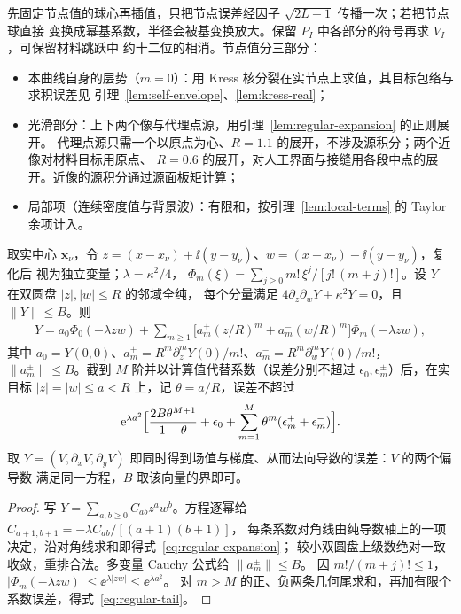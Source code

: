 先固定节点值的球心再插值，只把节点误差经因子 $\sqrt{2L-1}$ 传播一次；若把节点球直接
变换成幂基系数，半径会被基变换放大。保留 $P_I$ 中各部分的符号再求 $V_I$，可保留材料跳跃中
约十二位的相消。节点值分三部分：
\begin{itemize}
  \item 本曲线自身的层势（$m=0$）：用 Kress 核分裂在实节点上求值，其目标包络与求积误差见
    引理~\ref{lem:self-envelope}、\ref{lem:kress-real}；
  \item 光滑部分：上下两个像与代理点源，用引理~\ref{lem:regular-expansion} 的正则展开。
    代理点源只需一个以原点为心、$R=1.1$ 的展开，不涉及源积分；两个近像对材料目标用原点、
    $R=0.6$ 的展开，对人工界面与接缝用各段中点的展开。近像的源积分通过源面板矩计算；
  \item 局部项（连续密度值与背景波）：有限和，按引理~\ref{lem:local-terms} 的 Taylor 余项计入。
\end{itemize}

\begin{lemma}[正则 Helmholtz 展开]
  \label{lem:regular-expansion}
  取实中心 $\mathbf x_\nu$，令 $z=(x-x_\nu)+\ii(y-y_\nu)$、$w=(x-x_\nu)-\ii(y-y_\nu)$，复化后
  视为独立变量；$\lambda=\kappa^2/4$，
  $\Phi_m(\xi)=\sum_{j\geq0}m!\,\xi^j/[j!\,(m+j)!]$。设 $Y$ 在双圆盘 $|z|,|w|\leq R$ 的邻域全纯，
  每个分量满足 $4\partial_z\partial_wY+\kappa^2Y=0$，且 $\lVert Y\rVert\leq B$。则
  \begin{align}
    Y=a_0\Phi_0(-\lambda zw)+\sum_{m\geq1}\bigl[a_m^+(z/R)^m+a_m^-(w/R)^m\bigr]\Phi_m(-\lambda zw),
    \label{eq:regular-expansion}
  \end{align}
  其中 $a_0=Y(0,0)$、$a_m^+=R^m\partial_z^mY(0)/m!$、$a_m^-=R^m\partial_w^mY(0)/m!$，
  $\lVert a_m^\pm\rVert\leq B$。截到 $M$ 阶并以计算值代替系数（误差分别不超过
  $\epsilon_0,\epsilon_m^\pm$）后，在实目标 $|z|=|w|\leq a<R$ 上，记 $\theta=a/R$，误差不超过
  \begin{align}
    \mathrm{e}^{\lambda a^2}\Bigl[\frac{2B\theta^{M+1}}{1-\theta}+\epsilon_0
    +\sum_{m=1}^M\theta^m(\epsilon_m^++\epsilon_m^-)\Bigr].
    \label{eq:regular-tail}
  \end{align}
  取 $Y=(V,\partial_xV,\partial_yV)$ 即同时得到场值与梯度、从而法向导数的误差：$V$ 的两个偏导数
  满足同一方程，$B$ 取该向量的界即可。
\end{lemma}

\begin{proof}
  写 $Y=\sum_{a,b\ge0}C_{ab}z^aw^b$。方程逐幂给 $C_{a+1,b+1}=-\lambda C_{ab}/[(a+1)(b+1)]$，
  每条系数对角线由纯导数轴上的一项决定，沿对角线求和即得式~\eqref{eq:regular-expansion}；
  较小双圆盘上级数绝对一致收敛，重排合法。多变量 Cauchy 公式给 $\lVert a_m^\pm\rVert\leq B$。
  因 $m!/(m+j)!\leq1$，$|\Phi_m(-\lambda zw)|\leq\ee^{\lambda|zw|}\leq\ee^{\lambda a^2}$。
  对 $m>M$ 的正、负两条几何尾求和，再加有限个系数误差，得式~\eqref{eq:regular-tail}。
\end{proof}

